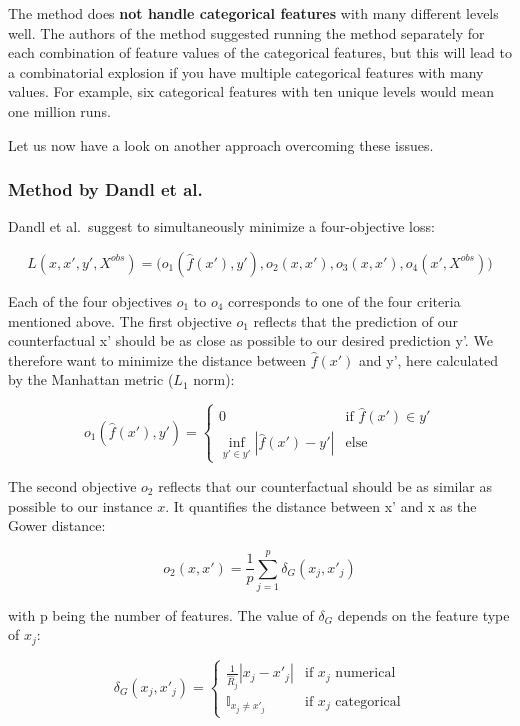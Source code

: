 \documentclass[
  10pt,
]{scrbook}
\begin{document}
The method does \textbf{not handle categorical features} with many different levels well.
The authors of the method suggested running the method separately for each combination of feature values of the categorical features, but this will lead to a combinatorial explosion if you have multiple categorical features with many values.
For example, six categorical features with ten unique levels would mean one million runs.

Let us now have a look on another approach overcoming these issues.

\hypertarget{method-by-dandl-et-al.}{%
\subsubsection{Method by Dandl et al.~}\label{method-by-dandl-et-al.}}

Dandl et al.~suggest to simultaneously minimize a four-objective loss:

\[L(x,x',y',X^{obs})=\big(o_1(\hat{f}(x'),y'),o_2(x, x'),o_3(x,x'),o_4(x',X^{obs})\big) \]

Each of the four objectives \(o_1\) to \(o_4\) corresponds to one of the four criteria mentioned above.
The first objective \(o_1\) reflects that the prediction of our counterfactual x' should be as close as possible to our desired prediction y'.
We therefore want to minimize the distance between \(\hat{f}(x')\) and y', here calculated by the Manhattan metric (\(L_1\) norm):

\[o_1(\hat{f}(x'),y')=\begin{cases}0&\text{if $\hat{f}(x')\in{}y'$}\\\inf\limits_{y'\in y'}|\hat{f}(x')-y'|&\text{else}\end{cases}\]

The second objective \(o_2\) reflects that our counterfactual should be as similar as possible to our instance \(x\).
It quantifies the distance between x' and x
as the Gower distance:

\[o_2(x,x')=\frac{1}{p}\sum_{j=1}^{p}\delta_G(x_j, x'_j)\]

with p being the number of features.
The value of \(\delta_G\) depends on the feature type of \(x_j\):

\[\delta_G(x_j,x'_j)=\begin{cases}\frac{1}{\widehat{R}_j}|x_j-x'_j|&\text{if $x_j$ numerical}\\\mathbb{I}_{x_j\neq{}x'_j}&\text{if $x_j$ categorical}\end{cases}\]
\end{document}
